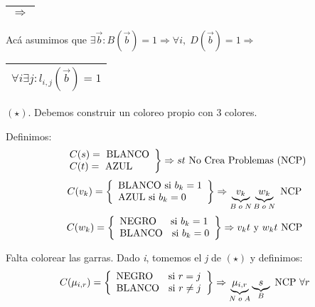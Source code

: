 \documentclass[12pt,a4paper]{report}
\newcounter{neq}
\begin{document}
		\vspace{5mm}
		\begin{tabular}{|c|} \hline $\Rightarrow$ \\ \hline \end{tabular}
			\par Acá asumimos que $\exists \overrightarrow{b} : B(\overrightarrow{b}) = 1 \Rightarrow \forall i, \; D(\overrightarrow{b}) = 1 \Rightarrow$ \begin{tabular}{|c|} \hline $\forall i \exists j : l_{i, j}(\overrightarrow{b}) = 1$ \\ \hline \end{tabular} $(\star)$. Debemos construir un coloreo propio con 3 colores.
			\par Definimos:
			 	\begin{equation*}
  					\left.
  					\begin{array}{l}
    		 			C(s) = \textup{ BLANCO} \\
    		 			C(t) = \textup{ AZUL}
  					\end{array}
 			 		\right\rbrace
 			 		\Rightarrow s t \textup{ No Crea Problemas (NCP)}
				\end{equation*}
				\begin{equation*}
					C(v_{k}) =
		  			\left\lbrace
  					\begin{array}{l}
    		 			\textup{BLANCO si } b_{k} = 1 \\
    		 			\textup{AZUL si } b_{k} = 0
  					\end{array}
 			 		\right\rbrace
 			 		\Rightarrow \underbrace{v_{k}}_{B \; o \; N} \underbrace{w_{k}}_{B \; o \; N} \textup{ NCP}
				\end{equation*}
				\begin{equation*}
					C(w_{k}) =
		  			\left\lbrace
  					\begin{array}{l}
    		 			\textup{NEGRO \; \, si } b_{k} = 1 \\
    		 			\textup{BLANCO \; si } b_{k} = 0
  					\end{array}
 			 		\right\rbrace
 			 		\Rightarrow v_{k} t  \textup { y } w_{k} t \textup{ NCP}
				\end{equation*}

		\par Falta colorear las garras. Dado \textit{i}, tomemos el \textit{j} de $(\star )$ y definimos:
				\begin{equation*}
					C(\mu_{i, r}) =
		  			\left\lbrace
  					\begin{array}{l}
    		 			\textup{NEGRO \; \; si } r = j \\
    		 			\textup{BLANCO \; si } r \neq j
  					\end{array}
 			 		\right\rbrace
 			 		\Rightarrow \underbrace{\mu_{i, r}}_{N \; o \; A} \underbrace{s}_{B} \textup{ NCP } \forall r
				\end{equation*}
\end{document}
